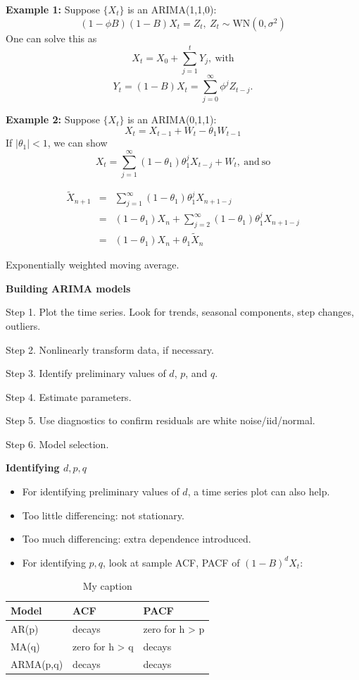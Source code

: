 \documentclass[]{book}
\providecommand{\tightlist}{%
  \setlength{\itemsep}{0pt}\setlength{\parskip}{0pt}}
\begin{document}
\textbf{Example 1:} Suppose \(\{X_t\}\) is an ARIMA(1,1,0): \[
(1-\phi B)(1-B)X_t=Z_t, ~ Z_t\sim \mathrm{WN}(0,\sigma^2)
\] One can solve this as \[
X_t=X_0+\sum_{j=1}^{t}Y_j, \mathrm{~with}
\] \[
Y_t=(1-B)X_t=\sum_{j=0}^{\infty}\phi^jZ_{t-j}.
\]

\textbf{Example 2:} Suppose \(\{X_t\}\) is an ARIMA(0,1,1): \[
X_t=X_{t-1}+W_t-\theta_1W_{t-1}
\] If \(|\theta_1|<1\), we can show \[
X_t=\sum_{j=1}^{\infty}(1-\theta_1)\theta_1^jX_{t-j}+W_t, \mathrm{~and~so}
\]

\begin{eqnarray*}
\tilde{X}_{n+1}&=&\sum_{j=1}^{\infty}(1-\theta_1)\theta_1^jX_{n+1-j}\\
&=& (1-\theta_1)X_n+\sum_{j=2}^{\infty}(1-\theta_1)\theta_1^jX_{n+1-j}\\
&=& (1-\theta_1)X_n+\theta_1\tilde{X}_{n}
\end{eqnarray*}

Exponentially weighted moving average.

\textbf{Building ARIMA models}

Step 1. Plot the time series. Look for trends, seasonal components, step
changes, outliers.

Step 2. Nonlinearly transform data, if necessary.

Step 3. Identify preliminary values of \(d\), \(p\), and \(q\).

Step 4. Estimate parameters.

Step 5. Use diagnostics to confirm residuals are white noise/iid/normal.

Step 6. Model selection.

\textbf{Identifying \(d, p, q\)}

\begin{itemize}
\tightlist
\item
  For identifying preliminary values of \(d\), a time series plot can
  also help.
\item
  Too little differencing: not stationary.
\item
  Too much differencing: extra dependence introduced.
\item
  For identifying \(p, q\), look at sample ACF, PACF of
  \((1 - B)^dX_t\):
\end{itemize}

\begin{table}[!h]

\caption{\label{tab:unnamed-chunk-158}My caption}
\centering
\begin{tabular}[t]{l|l|l}
\hline
Model & ACF & PACF\\
\hline
AR(p) & decays & zero for h > p\\
\hline
MA(q) & zero for h > q & decays\\
\hline
ARMA(p,q) & decays & decays\\
\hline
\end{tabular}
\end{table}
\end{document}
